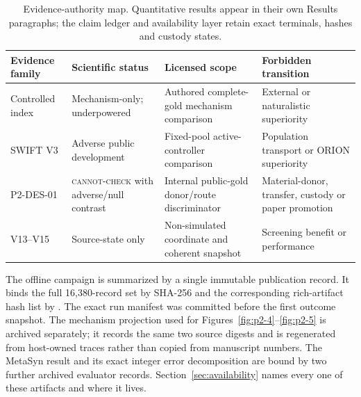 \begin{table}[t]
\centering
\small
\begin{tabularx}{\textwidth}{@{}p{}p{}X X@{}}
\hline
Evidence family & Scientific status & Licensed scope & Forbidden transition \\
\hline
Controlled index & Mechanism-only; underpowered & Authored complete-gold mechanism comparison & External or naturalistic superiority \\
SWIFT V3 & Adverse public development & Fixed-pool active-controller comparison & Population transport or ORION superiority \\
P2-DES-01 & \textsc{cannot-check} with adverse/null contrast & Internal public-gold donor/route discriminator & Material-donor, transfer, custody or paper promotion \\
V13--V15 & Source-state only & Non-simulated coordinate and coherent snapshot & Screening benefit or performance \\
\hline
\end{tabularx}
\caption{Evidence-authority map.  Quantitative results appear in their own
Results paragraphs; the claim ledger and availability layer retain exact
terminals, hashes and custody states.}
\label{tab:p2-evidence-authority}
\end{table}

The offline campaign is summarized by a single immutable publication record.
It binds the full 16,380-record set by SHA-256
and the corresponding rich-artifact hash list by
.
The exact run manifest was committed before the first outcome snapshot.  The
mechanism projection used for Figures~\ref{fig:p2-4}--\ref{fig:p2-5} is archived
separately; it records the same two source digests and is regenerated from
host-owned traces rather than copied from manuscript numbers.  The MetaSyn
result and its exact integer error decomposition are bound by two further
archived evaluator records.  Section~\ref{sec:availability} names every one of
these artifacts and where it lives.

